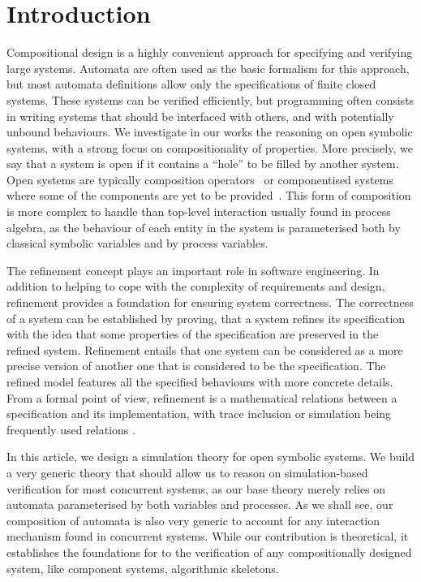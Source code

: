 \documentclass[runningheads]{llncs}
\begin{document}
\section{Introduction}
%
%
%
%
%
%
%
%
%

 Compositional design is a highly convenient approach 
for specifying and verifying large systems. 
Automata are often used as the basic formalism for this approach, but most automata definitions allow only the specifications of finite closed systems. These systems  can be verified efficiently, but programming often consists in writing  systems that should be interfaced with others, and with potentially unbound behaviours. We investigate in our works the reasoning on open symbolic systems, with a strong focus on compositionality of properties. More precisely, we say that a system is open if it contains a ``hole'' to be filled by another system. 
Open systems are typically composition operators~\cite{henrio:01299562} or componentised systems where some of the components are yet to be provided~\cite{AMHEEMA:2023}. This form of composition is more complex to handle than top-level interaction usually found in process algebra, as the behaviour of each entity in the system is parameterised both by classical symbolic variables and by process variables.

The refinement concept  plays  an important role in software engineering. In addition to helping to cope with the complexity of requirements and design, refinement provides a foundation for ensuring  system  correctness. The correctness of a system can
be established by proving, that a system refines its specification with the idea that some properties of the specification are preserved in the refined system.
Refinement entails that one system  can be considered as a more precise version of another one that is considered to be the specification. The refined model features all the specified behaviours with more concrete details. From a formal point of view,  refinement is a mathematical relations between a specification and its implementation, with trace inclusion or simulation being frequently used relations  \cite{Milner:1980,Kouchnarenko:2007}.

In this article, we design a simulation theory for open symbolic systems.  We build a very generic theory that should allow us to reason on simulation-based verification for most concurrent systems, as our base theory merely relies on automata parameterised by both variables and processes. As we shall see, our composition of automata is also very generic to account for any interaction mechanism found in concurrent systems.
While our contribution is theoretical, it establishes the foundations for to the verification of any compositionally designed system, like  component systems, algorithmic skeletons.
\end{document}
